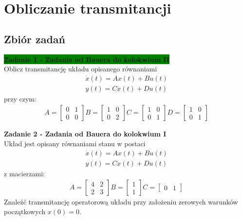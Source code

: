 \documentclass[a4paper,11pt]{article}
\begin{document}
\newpage
\section{Obliczanie transmitancji}
\subsection{Zbiór zadań}
\begin{framed}
\textbf{\colorbox{green}{Zadanie 1 - Zadania od Bauera do kolokwium II}} \\ 
Oblicz transmitancję układu opisanego równaniami
\begin{align*}
\dot{x}(t)=Ax(t)+Bu(t) \\
y(t)=Cx(t)+Du(t)
\end{align*}
przy czym: \\
\begin{align*}
A = 
\begin{bmatrix}
0 & 1 \\
0 & 0
\end{bmatrix}
B = 
\begin{bmatrix}
1 & 0 \\
0 & 2
\end{bmatrix}
C = 
\begin{bmatrix}
1 & 0 \\
0 & 1
\end{bmatrix}
D = 
\begin{bmatrix}
1 & 0 \\
0 & 1
\end{bmatrix}
\end{align*}
\end{framed}

\begin{framed}
\textbf{Zadanie 2 - Zadania od Bauera do kolokwium I } \\ 
Układ jest opisany równaniami stanu w postaci
\begin{align*}
\dot{x}(t)=Ax(t)+Bu(t) \\
y(t)=Cx(t)+Du(t)
\end{align*}
z macierzami: \\
\begin{align*}
A = 
\begin{bmatrix}
4 & 2 \\
2 & 3
\end{bmatrix}
B = 
\begin{bmatrix}
1  \\
1
\end{bmatrix}
C = 
\begin{bmatrix}
0 & 1
\end{bmatrix}
\end{align*}
Znaleźć transmitancję operatorową układu przy założeniu zerowych warunków początkowych \( x(0) = 0 \). 
\end{framed}
\end{document}
